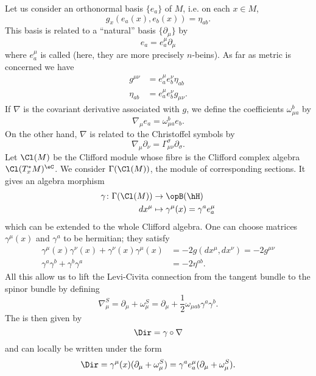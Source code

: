 Let us consider an orthonormal basis $\{ e_a \}$ of $M$, i.e. on each $x\in M$,
\[
	g_x(e_a(x),e_b(x))=\eta_{ab}.
\]
This basis is related to a ``natural'' basis $\{ \partial_{\mu} \}$ by
\begin{equation}
	e_a=e_a^{\mu}\partial_{\mu}
\end{equation}
where  $e_a^{\mu}$ is called  (here, they are more precisely $n$-beins). As far as metric is concerned we have
\begin{subequations}
	\begin{align}
		g^{\mu\nu} & =e_a^{\mu}e_b^{\nu}\eta_{ab}   \\
		\eta_{ab}  & =e_a^{\mu}e_b^{\nu}g_{\mu\nu}.
	\end{align}
\end{subequations}
If $\nabla$ is the covariant derivative associated with $g$, we define the coefficients $\omega_{\mu a}^b$ by
\begin{equation}
	\nabla_{\mu}e_a=\omega_{\mu a}^be_b.
\end{equation}
On the other hand, $\nabla$ is related to the Christoffel symbols by
\begin{equation}
	\nabla_{\mu}\partial_{\nu}=\Gamma_{\mu\nu}^{\sigma}\partial_{\sigma}.
\end{equation}
Let $\Cl(M)$ be the Clifford module whose fibre is the Clifford complex algebra $\Cl(T^*_xM)^{\eC}$. We consider $\Gamma(\Cl(M))$, the module of corresponding sections. It gives an algebra morphism
\begin{equation}
	\begin{aligned}
		\gamma\colon\Gamma(\Cl(M)) & \to \opB(\hH)                             \\
		dx^{\mu}                   & \mapsto \gamma^{\mu}(x)=\gamma^ae_a^{\mu}
	\end{aligned}
\end{equation}
which can be extended to the whole Clifford algebra. One can choose matrices $\gamma^{\mu}(x)$ and $\gamma^a$ to be hermitian; they satisfy
\begin{subequations}
	\begin{align}
		\gamma^{\mu}(x)\gamma^{\nu}(x)+\gamma^{\nu}(x)\gamma^{\mu}(x) & =-2g(dx^{\mu},dx^{\nu})=-2g^{\mu\nu} \\
		\gamma^a\gamma^b+\gamma^b\gamma^a                             & =-2\eta^{ab}.
	\end{align}
\end{subequations}
All this allow us to lift the Levi-Civita connection from the tangent bundle to the spinor bundle by defining
\begin{equation}
	\nabla_{\mu}^S=\partial_{\mu}+\omega^S_{\mu}=\partial_{\mu}+\frac{ 1 }{2}\omega_{\mu ab}\gamma^a\gamma^b.
\end{equation}
The  is then given by
\[
	\Dir=\gamma\circ\nabla
\]
and can locally be written under the form
\begin{equation}  \label{eq_Dirac_deux}
	\Dir=\gamma^{\mu}(x)(\partial_{\mu}+\omega_{\mu}^S)
	=\gamma^ae_a^{\mu}(\partial_{\mu}+\omega^S_{\mu}).
\end{equation}
